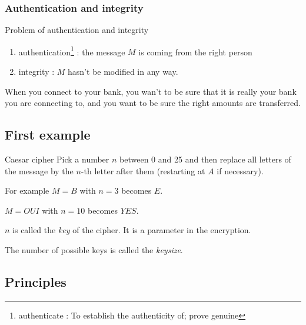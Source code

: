 \documentclass[compress]{beamer}
\theoremstyle{definition}
\theoremstyle{definition}
\theoremstyle{definition}
\theoremstyle{remark}
\theoremstyle{remark}
\theoremstyle{definition}
\theoremstyle{definition}
\theoremstyle{definition}
\theoremstyle{definition}
\theoremstyle{definition}
\theoremstyle{remark}
\theoremstyle{remark}
\theoremstyle{remark}
\theoremstyle{remark}
\begin{document}
				\subsubsection{Authentication and integrity}
				\begin{frame}
					\begin{exampleblock}{Problem of authentication and integrity}
						\begin{enumerate}
						
						\item authentication\footnote{authenticate : To establish the authenticity of; prove genuine} :  the message $M$ is coming from the right person
						\vspace*{8mm}
						\item integrity : $M$ hasn't be modified in any way.
						\vspace*{8mm}
						\end{enumerate}
					\end{exampleblock}
					\vspace*{10mm}
					When you connect to your bank, you wan't to be sure that it is really your bank you are connecting to, and you want to be sure the right amounts are transferred.
				\end{frame}
			\subsection{First example}
			\begin{frame}
				\begin{block}{Caesar cipher}
					Pick a number $n$ between 0 and 25 and then replace all letters of the message by the $n$-th letter after them (restarting at $A$ if necessary).
					\vspace*{10mm}
					
					For example $M= B$ with $n=3$ becomes $E$.
					 
					 $M = OUI$ with $n = 10$ becomes $YES$.
				\end{block}
					\vspace*{15mm}
					$n$ is called the \emph{key} of the cipher. It is a parameter in the encryption.
					\vspace*{8mm}
					
					The number of possible keys is called the \emph{keysize}.
			\end{frame}
			\subsection{Principles}
\end{document}
